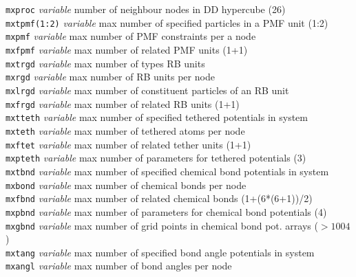 \begin{tabbing}
\> {\tt mxproc}      \> {\em variable}       \> number of neighbour nodes in DD hypercube (26) \\
\> {\tt mxtpmf(1:2)} \> {\em variable}       \> max number of specified particles in a PMF unit (1:2) \\
\> {\tt mxpmf}       \> {\em variable}       \> max number of PMF constraints per a node \\
\> {\tt mxfpmf}      \> {\em variable}       \> max number of related PMF units (1+1) \\
\> {\tt mxtrgd}      \> {\em variable}       \> max number of types RB units \\
\> {\tt mxrgd}       \> {\em variable}       \> max number of RB units per node \\
\> {\tt mxlrgd}      \> {\em variable}       \> max number of constituent particles of an RB unit \\
\> {\tt mxfrgd}      \> {\em variable}       \> max number of related RB units (1+1) \\
\> {\tt mxtteth}     \> {\em variable}       \> max number of specified tethered potentials in system \\
\> {\tt mxteth}      \> {\em variable}       \> max number of tethered atoms per node \\
\> {\tt mxftet}      \> {\em variable}       \> max number of related tether units (1+1) \\
\> {\tt mxpteth}     \> {\em variable}       \> max number of parameters for tethered potentials (3) \\
\> {\tt mxtbnd}      \> {\em variable}       \> max number of specified chemical bond potentials in system \\
\> {\tt mxbond}      \> {\em variable}       \> max number of chemical bonds per node \\
\> {\tt mxfbnd}      \> {\em variable}       \> max number of related chemical bonds (1+(6*(6+1))/2) \\
\> {\tt mxpbnd}      \> {\em variable}       \> max number of parameters for chemical bond potentials (4) \\
\> {\tt mxgbnd}      \> {\em variable}       \> max number of grid points in chemical bond pot. arrays ($> 1004$) \\
\> {\tt mxtang}      \> {\em variable}       \> max number of specified bond angle potentials in system \\
\> {\tt mxangl}      \> {\em variable}       \> max number of bond angles per node \\

\end{tabbing}
